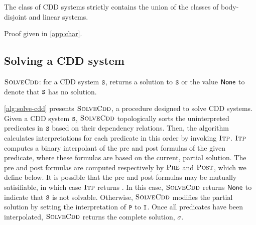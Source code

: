 \begin{thm}
	\label{thm:cdd-contains}
  The class of CDD systems strictly contains the union of the classes
  of body-disjoint and linear systems.
\end{thm}
%
Proof given in \autoref{app:char}.

\subsection{Solving a CDD system}
\label{sec:solve-cdd}

\begin{algorithm}[t]
  \caption{$\textsc{SolveCdd}$: for a CDD system $\cc{S}$, returns a
    solution to $\cc{S}$ or the value $\mathsf{None}$ to denote that
    $\cc{S}$ has no solution.}
  \label{alg:solve-cdd}
\end{algorithm}


\autoref{alg:solve-cdd} presents $\textsc{SolveCdd}$, a procedure designed to solve
CDD systems.
%
Given a CDD system $\cc{S}$, $\textsc{SolveCdd}$ topologically sorts the uninterpreted
predicates in $\cc{S}$ based on their dependency relations.
%
Then, the algorithm calculates interpretations for each predicate in this order
by invoking $\textsc{Itp}$.
%
$\textsc{Itp}$ computes a binary interpolant of the pre and post formulas of the
given predicate, where these formulas are based on the current, partial
solution.
%
The pre and post formulas are computed respectively by $\textsc{Pre}$ and
$\textsc{Post}$, which we define below.
%
It is possible that the pre and post formulas may be mutually satisifiable, in
which case $\textsc{Itp}$ returns . In this case, $\textsc{SolveCdd}$ returns
$\mathsf{None}$ to indicate that $\cc{S}$ is not solvable.
%
Otherwise, $\textsc{SolveCdd}$ modifies the partial solution by setting the
interpretation of $\cc{P}$ to $\cc{I}$.
%
Once all predicates have been interpolated, $\textsc{SolveCdd}$ returns the complete
solution, $\sigma$.

